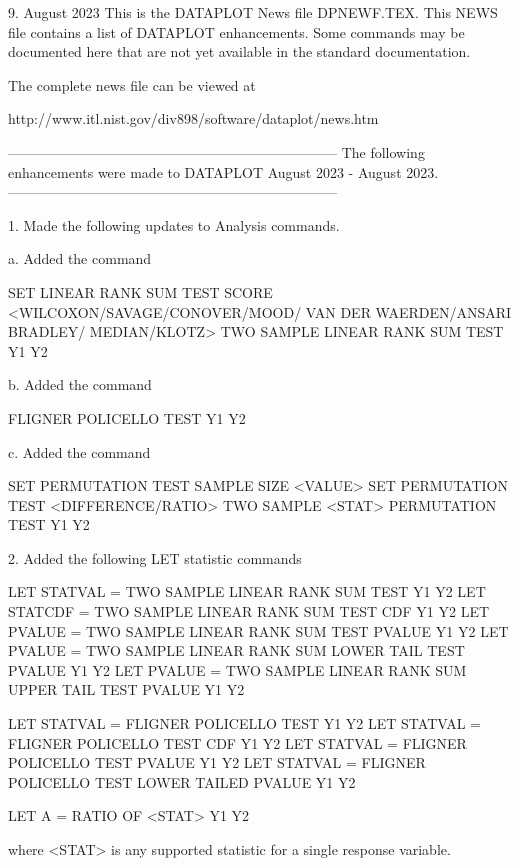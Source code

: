 9.
                                                     August 2023
This is the DATAPLOT News file DPNEWF.TEX.  This NEWS file contains a
list of DATAPLOT enhancements.  Some commands may be documented here
that are not yet available in the standard documentation.

The complete news file can be viewed at

    http://www.itl.nist.gov/div898/software/dataplot/news.htm

-----------------------------------------------------------------------
The following enhancements were made to DATAPLOT
August 2023 - August 2023.
-----------------------------------------------------------------------

 1. Made the following updates to Analysis commands.

    a. Added the command

         SET LINEAR RANK SUM TEST SCORE <WILCOXON/SAVAGE/CONOVER/MOOD/
                                         VAN DER WAERDEN/ANSARI BRADLEY/
                                         MEDIAN/KLOTZ>
         TWO SAMPLE LINEAR RANK SUM TEST Y1 Y2

    b. Added the command

         FLIGNER POLICELLO TEST Y1 Y2

    c. Added the command

         SET PERMUTATION TEST SAMPLE SIZE <VALUE>
         SET PERMUTATION TEST <DIFFERENCE/RATIO>
         TWO SAMPLE <STAT> PERMUTATION TEST Y1 Y2

 2. Added the following LET statistic commands

        LET STATVAL = TWO SAMPLE LINEAR RANK SUM TEST                   Y1 Y2
        LET STATCDF = TWO SAMPLE LINEAR RANK SUM TEST CDF               Y1 Y2
        LET PVALUE  = TWO SAMPLE LINEAR RANK SUM TEST PVALUE            Y1 Y2
        LET PVALUE  = TWO SAMPLE LINEAR RANK SUM LOWER TAIL TEST PVALUE Y1 Y2
        LET PVALUE  = TWO SAMPLE LINEAR RANK SUM UPPER TAIL TEST PVALUE Y1 Y2

        LET STATVAL = FLIGNER POLICELLO TEST                     Y1 Y2
        LET STATVAL = FLIGNER POLICELLO TEST CDF                 Y1 Y2
        LET STATVAL = FLIGNER POLICELLO TEST PVALUE              Y1 Y2
        LET STATVAL = FLIGNER POLICELLO TEST LOWER TAILED PVALUE Y1 Y2

        LET A = RATIO OF <STAT>  Y1 Y2

        where <STAT> is any supported statistic for a single response
        variable.

